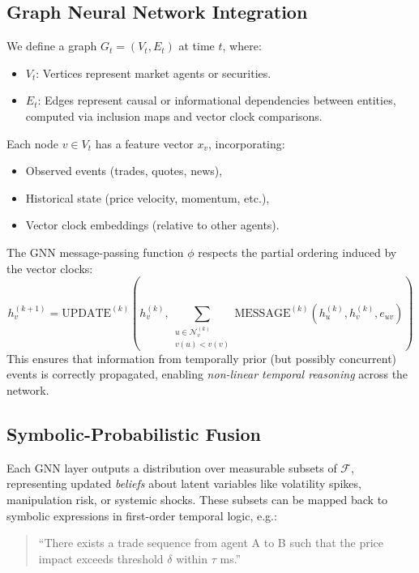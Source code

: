 \subsection{Graph Neural Network Integration}

We define a graph $G_t = (V_t, E_t)$ at time $t$, where:
\begin{itemize}
    \item $V_t$: Vertices represent market agents or securities.
    \item $E_t$: Edges represent causal or informational dependencies between entities, computed via inclusion maps and vector clock comparisons.
\end{itemize}

Each node $v \in V_t$ has a feature vector $x_v$, incorporating:
\begin{itemize}
    \item Observed events (trades, quotes, news),
    \item Historical state (price velocity, momentum, etc.),
    \item Vector clock embeddings (relative to other agents).
\end{itemize}

The GNN message-passing function $\phi$ respects the partial ordering induced by the vector clocks:
\[
h_v^{(k+1)} = \text{UPDATE}^{(k)}\left(h_v^{(k)}, \sum_{\substack{u \in \mathcal{N}_v^{(k)} \\ v(u) < v(v)}} \text{MESSAGE}^{(k)}(h_u^{(k)}, h_v^{(k)}, e_{uv})\right)
\]
This ensures that information from temporally prior (but possibly concurrent) events is correctly propagated, enabling \emph{non-linear temporal reasoning} across the network.

\subsection{Symbolic-Probabilistic Fusion}

Each GNN layer outputs a distribution over measurable subsets of $\mathcal{F}$, representing updated \emph{beliefs} about latent variables like volatility spikes, manipulation risk, or systemic shocks. These subsets can be mapped back to symbolic expressions in first-order temporal logic, e.g.:

\begin{quote}
``There exists a trade sequence from agent A to B such that the price impact exceeds threshold $\delta$ within $\tau$ ms.''
\end{quote}

